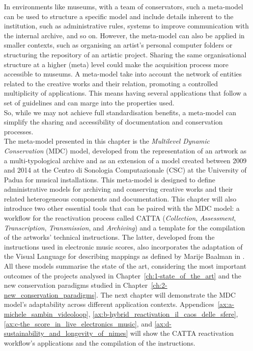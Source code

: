 In environments like museums, with a team of conservators, such a meta-model can be used to structure a specific model and include details inherent to the institution, such as administrative rules, systems to improve communication with the internal archive, and so on. However, the meta-model can also be applied in smaller contexts, such as organising an artist’s personal computer folders or structuring the repository of an artistic project. Sharing the same organisational structure at a higher (meta) level could make the acquisition process more accessible to museums. A meta-model take into account the network of entities related to the creative works and their relation, promoting a controlled multiplicity of applications. This means having several applications that follow a set of guidelines and can marge into the properties used.\\
So, while we may not achieve full standardisation benefits, a meta-model can simplify the sharing and accessibility of documentation and conservation processes.\\
The meta-model presented in this chapter is the \textit{Multilevel Dynamic Conservation} (MDC) model, developed from the representation of an artwork as a multi-typological archive and as an extension of a model created between 2009 and 2014 at the Centro di Sonologia Computazionale (CSC) at the University of Padua for musical installations. This meta-model is designed to define administrative models for archiving and conserving creative works and their related heterogeneous components and documentation. This chapter will also introduce two other essential tools that can be paired with the MDC model: a workflow for the reactivation process called CATTA (\textit{Collection}, \textit{Assessment}, \textit{Transcription}, \textit{Transmission}, and \textit{Archiving}) and a template for the compilation of the artworks' technical instructions. The latter, developed from the instructions used in electronic music scores, also incorporates the adaptation of the Visual Language for describing mappings as defined by Marije Baalman in \cite{baalman2022composing}.\\
All these models summarise the state of the art, considering the most important outcomes of the projects analysed in Chapter~\ref{ch:1-state_of_the_art} and the new conservation paradigms studied in Chapter~\ref{ch:2-new_conservation_paradigms}. The next chapter will demonstrate the MDC model's adaptability across different application contexts. Appendices~\ref{ax:a-michele_sambin_videoloop}, \ref{ax:b-hybrid_reactivation_il_caos_delle_sfere}, \ref{ax:c-the_score_in_live_electronics_music}, and \ref{ax:d-sustainability_and_longevity_of_nimes} will show the CATTA reactivation workflow's applications and the compilation of the instructions.

